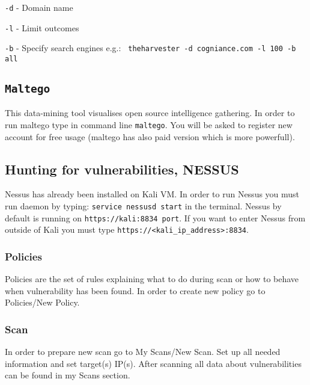 \documentclass{article}[12pt]
\begin{document}
\texttt{-d} - Domain name
\newline

\texttt{-l} - Limit outcomes
\newline

\texttt{-b} - Specify search engines e.g.: \texttt{ theharvester -d cogniance.com -l 100 -b all }


\subsection{\texttt{Maltego}}
\label{subsec:maltego}
This data-mining tool visualises open source intelligence gathering.
In order to run maltego type in command line \texttt{maltego}.
You will be asked to register new account for free usage (maltego has also paid version which is more powerfull).



\subsubsection*{\texttt{}}

\subsection{Hunting for vulnerabilities, NESSUS}

Nessus has already been installed on Kali VM. In order to run Nessus you must run daemon by typing: \texttt{service nessusd start} in the terminal.
Nessus by default is running on \texttt{https://kali:8834 port}.
If you want to enter Nessus from outside of Kali you must type \texttt{https://<kali\_ip\_address>:8834}.

\subsubsection{Policies}

Policies are the set of rules explaining what to do during scan or how to behave when vulnerability has been found.
In order to create new policy go to Policies/New Policy.

\subsubsection{Scan}

In order to prepare new scan go to My Scans/New Scan.
Set up all needed information and set target(s) IP(s).
After scanning all data about vulnerabilities can be found in my Scans section.
\end{document}
